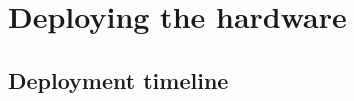 \section{Deploying the hardware}
\label{sec:deployment}
\begin{colsection}


\begin{colsection}


\end{colsection}


\subsection{Deployment timeline}
\label{sec:timeline}
\begin{colsection}



\end{colsection}
\end{colsection}
